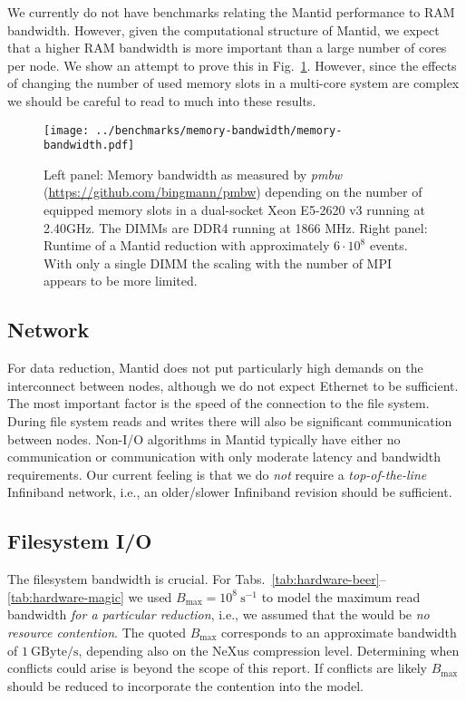 \documentclass[a4paper,english,numbers=noenddot,bibliography=totoc,chapterprefix=on,DIV=12]{scrartcl}
\newcommand{\Bmax}{B_{\text{max}}}
\newcommand{\mantid}{Mantid\xspace}
\newcommand{\nexus}{NeXus\xspace}
\begin{document}
We currently do not have benchmarks relating the \mantid performance to RAM bandwidth.
However, given the computational structure of \mantid, we expect that a higher RAM bandwidth is more important than a large number of cores per node.
We show an attempt to prove this in Fig.~\ref{fig:memory-bandwidth}.
However, since the effects of changing the number of used memory slots in a multi-core system are complex we should be careful to read to much into these results.

\begin{figure}
  \centering
\texttt{[image: ../benchmarks/memory-bandwidth/memory-bandwidth.pdf]}
\caption{\label{fig:memory-bandwidth}
Left panel:
Memory bandwidth as measured by \emph{pmbw} (\url{https://github.com/bingmann/pmbw}) depending on the number of equipped memory slots in a dual-socket Xeon E5-2620 v3 running at 2.40GHz.
The DIMMs are DDR4 running at 1866 MHz.
Right panel:
Runtime of a \mantid reduction with approximately $6\cdot10^8$ events.
With only a single DIMM the scaling with the number of MPI appears to be more limited.
}
\end{figure}


\subsection{Network}

For data reduction, \mantid does not put particularly high demands on the interconnect between nodes, although we do not expect Ethernet to be sufficient.
The most important factor is the speed of the connection to the file system.
During file system reads and writes there will also be significant communication between nodes.
Non-I/O algorithms in \mantid typically have either no communication or communication with only moderate latency and bandwidth requirements.
Our current feeling is that we do \emph{not} require a \emph{top-of-the-line} Infiniband network, i.e., an older/slower Infiniband revision should be sufficient.


\subsection{Filesystem I/O}

The filesystem bandwidth is crucial.
For Tabs.~\ref{tab:hardware-beer}--\ref{tab:hardware-magic} we used $\Bmax = 10^8~\mathrm{s}^{-1}$ to model the maximum read bandwidth \emph{for a particular reduction}, i.e., we assumed that the would be \emph{no resource contention}.
The quoted $\Bmax$ corresponds to an approximate bandwidth of $1~\mathrm{GByte/s}$, depending also on the \nexus compression level.
Determining when conflicts could arise is beyond the scope of this report.
If conflicts are likely $\Bmax$ should be reduced to incorporate the contention into the model.
\end{document}
